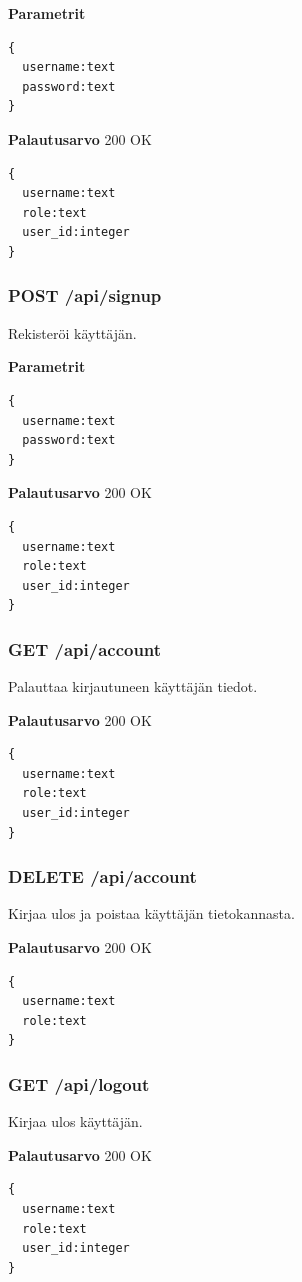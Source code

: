\documentclass[a4paper,parskip=half]{scrartcl}
\begin{document}
\textbf{Parametrit}
\begin{Verbatim}
{
  username:text
  password:text
}
\end{Verbatim}

\textbf{Palautusarvo}
200 OK
\begin{Verbatim}
{
  username:text
  role:text
  user_id:integer
}
\end{Verbatim}

\subsubsection{POST /api/signup}
Rekisteröi käyttäjän.

\textbf{Parametrit}
\begin{Verbatim}
{
  username:text
  password:text
}
\end{Verbatim}

\textbf{Palautusarvo}
200 OK
\begin{Verbatim}
{
  username:text
  role:text
  user_id:integer
}
\end{Verbatim}

\subsubsection{GET /api/account}
Palauttaa kirjautuneen käyttäjän tiedot.

\textbf{Palautusarvo}
200 OK
\begin{Verbatim}
{
  username:text
  role:text
  user_id:integer
}
\end{Verbatim}

\subsubsection{DELETE /api/account}
Kirjaa ulos ja poistaa käyttäjän tietokannasta.

\textbf{Palautusarvo}
200 OK
\begin{Verbatim}
{
  username:text
  role:text
}
\end{Verbatim}

\subsubsection{GET /api/logout}
Kirjaa ulos käyttäjän.

\textbf{Palautusarvo}
200 OK
\begin{Verbatim}
{
  username:text
  role:text
  user_id:integer
}
\end{Verbatim}
\end{document}
